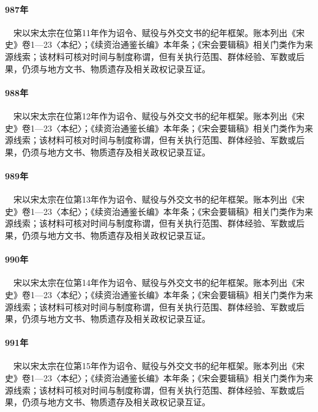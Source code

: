\paragraph{987年}　宋以宋太宗在位第11年作为诏令、赋役与外交文书的纪年框架。账本列出《宋史》卷1—23〈本纪〉；《续资治通鉴长编》本年条；《宋会要辑稿》相关门类作为来源线索；该材料可核对时间与制度称谓，但有关执行范围、群体经验、军数或后果，仍须与地方文书、物质遗存及相关政权记录互证。

\paragraph{988年}　宋以宋太宗在位第12年作为诏令、赋役与外交文书的纪年框架。账本列出《宋史》卷1—23〈本纪〉；《续资治通鉴长编》本年条；《宋会要辑稿》相关门类作为来源线索；该材料可核对时间与制度称谓，但有关执行范围、群体经验、军数或后果，仍须与地方文书、物质遗存及相关政权记录互证。

\paragraph{989年}　宋以宋太宗在位第13年作为诏令、赋役与外交文书的纪年框架。账本列出《宋史》卷1—23〈本纪〉；《续资治通鉴长编》本年条；《宋会要辑稿》相关门类作为来源线索；该材料可核对时间与制度称谓，但有关执行范围、群体经验、军数或后果，仍须与地方文书、物质遗存及相关政权记录互证。

\paragraph{990年}　宋以宋太宗在位第14年作为诏令、赋役与外交文书的纪年框架。账本列出《宋史》卷1—23〈本纪〉；《续资治通鉴长编》本年条；《宋会要辑稿》相关门类作为来源线索；该材料可核对时间与制度称谓，但有关执行范围、群体经验、军数或后果，仍须与地方文书、物质遗存及相关政权记录互证。

\paragraph{991年}　宋以宋太宗在位第15年作为诏令、赋役与外交文书的纪年框架。账本列出《宋史》卷1—23〈本纪〉；《续资治通鉴长编》本年条；《宋会要辑稿》相关门类作为来源线索；该材料可核对时间与制度称谓，但有关执行范围、群体经验、军数或后果，仍须与地方文书、物质遗存及相关政权记录互证。

